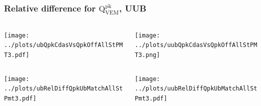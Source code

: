 \documentclass[aspectratio=169]{beamer}
\begin{document}
\begin{frame}
  \frametitle{Relative difference for
  $\mathrm{Q}^{\mathrm{pk}}_{\mathrm{VEM}}$, UUB}
  \begin{center}
    \begin{columns}
      \begin{column}{.5\textwidth}
        \texttt{[image: ../plots/ubQpkCdasVsQpkOffAllStPMT3.pdf]}
      \end{column}
      \begin{column}{.5\textwidth}
        \texttt{[image: ../plots/uubQpkCdasVsQpkOffAllStPMT3.png]}
      \end{column}
    \end{columns}
    \begin{columns}
      \begin{column}{.5\textwidth}
        \texttt{[image: ../plots/ubRelDiffQpkUbMatchAllStPmt3.pdf]}
      \end{column}
      \begin{column}{.5\textwidth}
        \texttt{[image: ../plots/uubRelDiffQpkUbMatchAllStPmt3.pdf]}
      \end{column}
    \end{columns}
  \end{center}
\end{frame}
\end{document}
